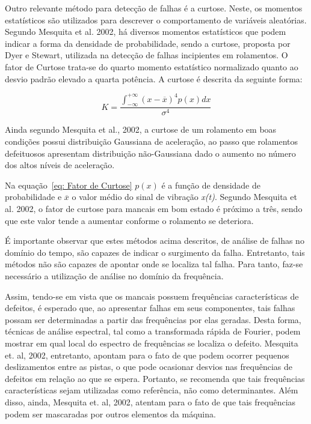 \documentclass[
	12pt,				
	oneside,			
	a4paper,			
	english,			
	brazil,			
	]{abntex2ppgsi}
\begin{document}
Outro relevante método para detecção de falhas é a curtose. Neste, os momentos estatísticos são utilizados para descrever o comportamento de variáveis aleatórias. Segundo Mesquita et al. 2002, há diversos momentos estatísticos que podem indicar a forma da densidade de probabilidade, sendo a curtose, proposta por Dyer e Stewart, utilizada na detecção de falhas incipientes em rolamentos. O fator de Curtose trata-se do quarto momento estatístico normalizado quanto ao desvio padrão elevado a quarta potência. A curtose é descrita da seguinte forma:

\begin{equation}
	K = \frac{ \int_{-\infty}^{+\infty} (x - \overline{x})^{4}p(x)dx } {\sigma^{4}}
	\label{eq: Fator de Curtose}
\end{equation}

Ainda segundo Mesquita et al., 2002, a curtose de um rolamento em boas condições possui distribuição Gaussiana de aceleração, ao passo que rolamentos defeituosos apresentam distribuição não-Gaussiana dado o aumento no número dos altos níveis de aceleração. 

Na equação~\ref{eq: Fator de Curtose} $p(x)$ é a função de densidade de probabilidade e $\overline{x}$ o valor médio do sinal de vibração \textit{x(t)}. Segundo Mesquita et al. 2002, o fator de curtose para mancais em bom estado é próximo a três, sendo que este valor tende a aumentar conforme o rolamento se deteriora. 

É importante observar que estes métodos acima descritos, de análise de falhas no domínio do tempo, são capazes de indicar o surgimento da falha. Entretanto, tais métodos não são capazes de apontar onde se localiza tal falha. Para tanto, faz-se necessário a utilização de análise no domínio da frequência. 

Assim, tendo-se em vista que os mancais possuem frequências características de defeitos, é esperado que, ao apresentar falhas em seus componentes, tais falhas possam ser determinadas a partir das frequências por elas geradas. Desta forma, técnicas de análise espectral, tal como a transformada rápida de Fourier, podem mostrar em qual local do espectro de frequências se localiza o defeito. Mesquita et. al, 2002, entretanto, apontam para o fato de que podem ocorrer pequenos deslizamentos entre as pistas, o que pode ocasionar desvios nas frequências de defeitos em relação ao que se espera. Portanto, se recomenda que tais frequências características sejam utilizadas como referência, não como determinantes. Além disso, ainda, Mesquita et. al, 2002, atentam para o fato de que tais frequências podem ser mascaradas por outros elementos da máquina.
\end{document}
